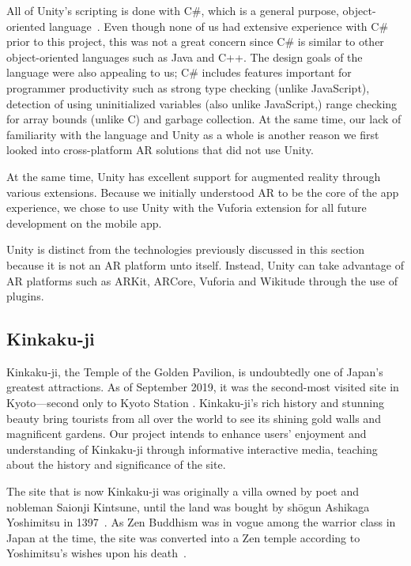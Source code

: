 \documentclass[a4paper, 10pt, american, titlepage]{article}
\begin{document}
All of Unity's scripting is done with C\#, which is a general purpose,
object-oriented language~\autocite{ecmainternational2017}. Even though none of
us had extensive experience with C\# prior to this project, this was not a great
concern since C\# is similar to other object-oriented languages such as Java and
C++. The design goals of the language were also appealing to us; C\# includes
features important for programmer productivity such as strong type checking
(unlike JavaScript), detection of using uninitialized variables (also unlike
JavaScript,) range checking for array bounds (unlike C) and garbage collection.
At the same time, our lack of familiarity with the language and Unity as a whole
is another reason we first looked into cross-platform AR solutions that did not
use Unity.

At the same time, Unity has excellent support for augmented reality through
various extensions. Because we initially understood AR to be the core of the app
experience, we chose to use Unity with the Vuforia extension for all future
development on the mobile app.

Unity is distinct from the technologies previously discussed in this section
because it is not an AR platform unto itself. Instead, Unity can take advantage
of AR platforms such as ARKit, ARCore, Vuforia and Wikitude through the use of
plugins.

\subsection{Kinkaku-ji}
\label{sec:kinkaku-ji}

Kinkaku-ji, the Temple of the Golden Pavilion, is undoubtedly one of Japan's
greatest attractions.  As of September 2019, it was the second-most visited site
in Kyoto---second only to Kyoto Station \autocite{japanguide2019}. Kinkaku-ji's
rich history and stunning beauty bring tourists from all over the world to see
its shining gold walls and magnificent gardens. Our project intends to enhance
users' enjoyment and understanding of Kinkaku-ji through informative interactive
media, teaching about the history and significance of the site.

The site that is now Kinkaku-ji was originally a villa owned by poet and
nobleman Saionji Kintsune, until the land was bought by shōgun Ashikaga
Yoshimitsu in 1397~\autocite{noboru2013}. As Zen Buddhism was in vogue among the
warrior class in Japan at the time, the site was converted into a Zen temple
according to Yoshimitsu's wishes upon his death~\autocite{bornoff2000}.
\end{document}
